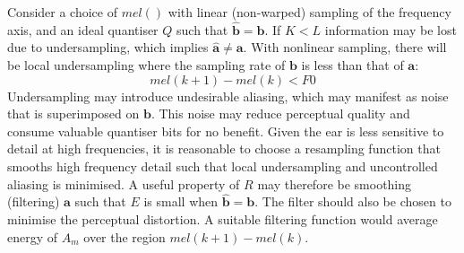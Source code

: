 \documentclass{article}
\begin{document}
Consider a choice of $mel()$ with linear (non-warped) sampling of the frequency axis, and an ideal quantiser $Q$ such that $\hat{\mathbf{b}} = \mathbf{b}$. If $K<L$ information may be lost due to undersampling, which implies $\hat{\mathbf{a}} \neq \mathbf{a}$.  
With nonlinear sampling, there will be local undersampling where the sampling rate of $\mathbf{b}$ is less than that of $\mathbf{a}$:
\begin{equation}
mel(k+1)-mel(k) < F0
\end{equation}
Undersampling may introduce undesirable aliasing, which may manifest as noise that is superimposed on $\mathbf{b}$. This noise may reduce perceptual quality and consume valuable quantiser bits for no benefit. Given the ear is less sensitive to detail at high frequencies, it is reasonable to choose a resampling function that smooths high frequency detail such that local undersampling and uncontrolled aliasing is minimised. A useful property of $R$ may therefore be smoothing (filtering) $\mathbf{a}$ such that $E$ is small when $\hat{\mathbf{b}} = \mathbf{b}$.  The filter should also be chosen to minimise the perceptual distortion.  A suitable filtering function would average energy of $A_m$ over the region $mel(k+1)-mel(k)$.
\end{document}
